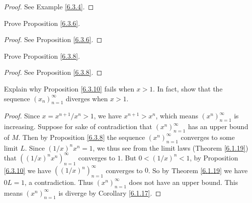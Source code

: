 \begin{proof}
    See Example \ref{6.3.4}.
\end{proof}

\begin{exercise}\label{ex 6.3.2}
    Prove Proposition \ref{6.3.6}.
\end{exercise}

\begin{proof}
    See Proposition \ref{6.3.6}.
\end{proof}

\begin{exercise}\label{ex 6.3.3}
    Prove Proposition \ref{6.3.8}.
\end{exercise}

\begin{proof}
    See Proposition \ref{6.3.8}.
\end{proof}

\begin{exercise}\label{ex 6.3.4}
    Explain why Proposition \ref{6.3.10} fails when \(x > 1\).
    In fact, show that the sequence \((x_n)_{n = 1}^\infty\) diverges when \(x > 1\).
\end{exercise}

\begin{proof}
    Since \(x = x^{n + 1} / x^n > 1\), we have \(x^{n + 1} > x^n\), which means \((x^n)_{n = 1}^\infty\) is increasing.
    Suppose for sake of contradiction that \((x^n)_{n = 1}^\infty\) has an upper bound of \(M\).
    Then by Proposition \ref{6.3.8} the sequence \((x^n)_{n = 1}^\infty\) converges to some limit \(L\).
    Since \((1 / x)^n x^n = 1\), we thus see from the limit laws (Theorem \ref{6.1.19}) that \(((1 / x)^n x^n)_{n = 1}^\infty\) converges to \(1\).
    But \(0 < (1 / x)^n < 1\), by Proposition \ref{6.3.10} we have \(((1 / x)^n)_{n = 1}^\infty\) converges to \(0\).
    So by Theorem \ref{6.1.19} we have \(0L = 1\), a contradiction.
    Thus \((x^n)_{n = 1}^\infty\) does not have an upper bound.
    This means \((x^n)_{n = 1}^\infty\) is diverge by Corollary \ref{6.1.17}.
\end{proof}